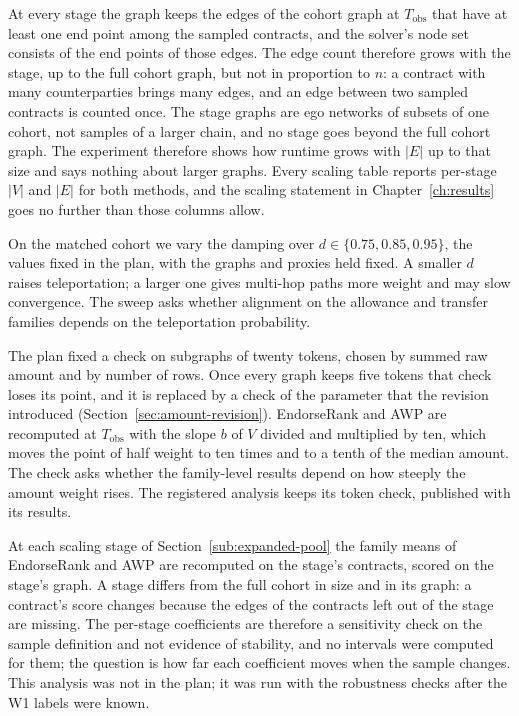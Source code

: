 At every stage the graph keeps the edges of the cohort graph at $T_{\mathrm{obs}}$ that have at least one end point among the sampled contracts, and the solver's node set consists of the end points of those edges. The edge count therefore grows with the stage, up to the full cohort graph, but not in proportion to $n$: a contract with many counterparties brings many edges, and an edge between two sampled contracts is counted once. The stage graphs are ego networks of subsets of one cohort, not samples of a larger chain, and no stage goes beyond the full cohort graph. The experiment therefore shows how runtime grows with $|E|$ up to that size and says nothing about larger graphs. Every scaling table reports per-stage $|V|$ and $|E|$ for both methods, and the scaling statement in Chapter~\ref{ch:results} goes no further than those columns allow.


On the matched cohort we vary the damping over $d\in\{0.75,0.85,0.95\}$, the values fixed in the plan, with the graphs and proxies held fixed. A smaller $d$ raises teleportation; a larger one gives multi-hop paths more weight and may slow convergence. The sweep asks whether alignment on the allowance and transfer families depends on the teleportation probability.


The plan fixed a check on subgraphs of twenty tokens, chosen by summed raw amount and by number of rows. Once every graph keeps five tokens that check loses its point, and it is replaced by a check of the parameter that the revision introduced (Section~\ref{sec:amount-revision}). EndorseRank and AWP are recomputed at $T_{\mathrm{obs}}$ with the slope $b$ of $V$ divided and multiplied by ten, which moves the point of half weight to ten times and to a tenth of the median amount. The check asks whether the family-level results depend on how steeply the amount weight rises. The registered analysis keeps its token check, published with its results.


At each scaling stage of Section~\ref{sub:expanded-pool} the family means of EndorseRank and AWP are recomputed on the stage's contracts, scored on the stage's graph. A stage differs from the full cohort in size and in its graph: a contract's score changes because the edges of the contracts left out of the stage are missing. The per-stage coefficients are therefore a sensitivity check on the sample definition and not evidence of stability, and no intervals were computed for them; the question is how far each coefficient moves when the sample changes. This analysis was not in the plan; it was run with the robustness checks after the W1 labels were known.

